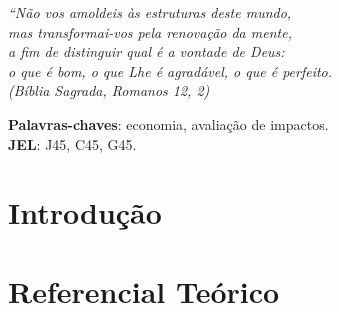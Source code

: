 \documentclass[12pt,english, french, spanish, brazil,a4paper,twoside, openright]{abntex2}	%
\begin{document}
\begin{agradecimentos}


	
\end{agradecimentos}

\begin{epigrafe}
	\vspace*{\fill}
	\begin{flushright}
		\textit{``Não vos amoldeis às estruturas deste mundo, \\
			mas transformai-vos pela renovação da mente, \\
			a fim de distinguir qual é a vontade de Deus: \\
			o que é bom, o que Lhe é agradável, o que é perfeito.\\
			(Bíblia Sagrada, Romanos 12, 2)}
	\end{flushright}
\end{epigrafe}




\setlength{\absparsep}{18pt} %
\begin{resumoumacoluna}
	
	
		\vspace{\onelineskip}
	
	\noindent
	\textbf{Palavras-chaves}: economia, avaliação de impactos. \\	%
	\textbf{JEL}: J45, C45, G45.	%
	
	
	\end{resumoumacoluna}




\tableofcontents*
\cleardoublepage



\textual	%
\hypertarget{introduuxe7uxe3o}{%
\section{Introdução}\label{introduuxe7uxe3o}}

\hypertarget{referencial-teuxf3rico}{%
\section{Referencial Teórico}\label{referencial-teuxf3rico}}
\end{document}

